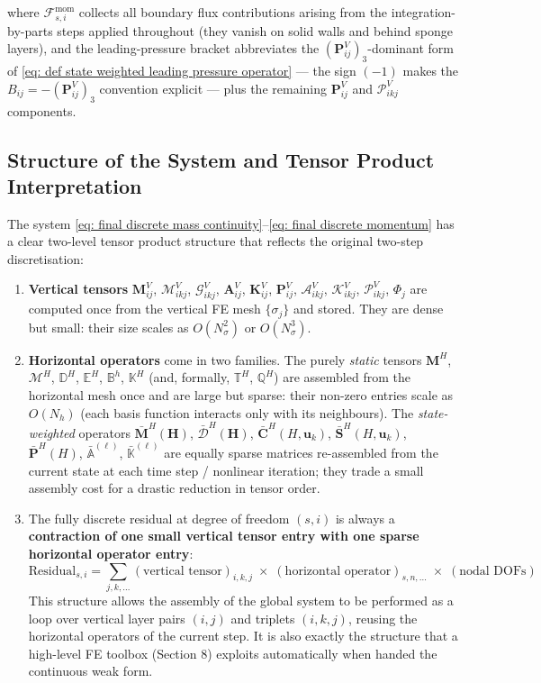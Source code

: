 \documentclass{article}
\newcommand{\Ns}{N_\sigma}
\newcommand{\uk}{\mathbf{u}_k}
\newcommand{\VMij}{\mathbf{M}_{ij}^V}
\newcommand{\VAij}{\mathbf{A}_{ij}^V}
\newcommand{\VKij}{\mathbf{K}_{ij}^V}
\newcommand{\VMikj}{\boldsymbol{\mathcal{M}}_{ikj}^V}
\newcommand{\VGikj}{\boldsymbol{\mathcal{G}}_{ikj}^V}
\newcommand{\VAikj}{\boldsymbol{\mathcal{A}}_{ikj}^V}
\newcommand{\VKikj}{\boldsymbol{\mathcal{K}}_{ikj}^V}
\newcommand{\VPij}{\mathbf{P}_{ij}^V}
\newcommand{\VPikj}{\boldsymbol{\mathcal{P}}_{ikj}^V}
\newcommand{\Nh}{N_h}
\newcommand{\HmM}{\mathbf{M}^H}
\newcommand{\HtM}{\boldsymbol{\mathcal{M}}^H}
\newcommand{\HtDdwH}{\bar{\boldsymbol{\mathcal{D}}}^H(\Hvec)}
\newcommand{\HmMdwH}{\bar{\mathbf{M}}^H(\Hvec)}
\newcommand{\HttD}{\mathbb{D}^H}
\newcommand{\Hvec}{\mathbf{H}}
\begin{document}
\noindent where $\mathcal{F}_{s,i}^{\text{mom}}$ collects all boundary flux contributions arising from the integration-by-parts steps applied throughout (they vanish on solid walls and behind sponge layers), and the leading-pressure bracket abbreviates the $(\VPij)_3$-dominant form of \eqref{eq: def state weighted leading pressure operator} — the sign $(-1)$ makes the $B_{ij} = -(\VPij)_3$ convention explicit — plus the remaining $\VPij$ and $\VPikj$ components.
 
\subsection{Structure of the System and Tensor Product Interpretation}
 
The system \eqref{eq: final discrete mass continuity}--\eqref{eq: final discrete momentum} has a clear two-level tensor product structure that reflects the original two-step discretisation:
 
\begin{enumerate}
    \item \textbf{Vertical tensors} $\VMij$, $\VMikj$, $\VGikj$, $\VAij$, $\VKij$, $\VPij$, $\VAikj$, $\VKikj$, $\VPikj$, $\Phi_j$ are computed once from the vertical FE mesh $\{\sigma_j\}$ and stored. They are dense but small: their size scales as $O(\Ns^2)$ or $O(\Ns^3)$.

    \item \textbf{Horizontal operators} come in two families. The purely \emph{static} tensors $\HmM$, $\HtM$, $\HttD$, $\mathbb{E}^H$, $\mathbb{B}^h$, $\mathbb{K}^H$ (and, formally, $\mathbb{T}^H$, $\mathbb{Q}^H$) are assembled from the horizontal mesh once and are large but sparse: their non-zero entries scale as $O(\Nh)$ (each basis function interacts only with its neighbours). The \emph{state-weighted} operators $\HmMdwH$, $\HtDdwH$, $\bar{\mathbf{C}}^H(H,\uk)$, $\bar{\mathbf{S}}^H(H,\uk)$, $\bar{\mathbf{P}}^H(H)$, $\bar{\mathbb{A}}^{(\ell)}$, $\bar{\mathbb{K}}^{(\ell)}$ are equally sparse matrices re-assembled from the current state at each time step / nonlinear iteration; they trade a small assembly cost for a drastic reduction in tensor order.

    \item The fully discrete residual at degree of freedom $(s,i)$ is always a \textbf{contraction of one small vertical tensor entry with one sparse horizontal operator entry}:
    \begin{equation*}
        \text{Residual}_{s,i} = \sum_{j,k,\ldots} (\text{vertical tensor})_{i,k,j}\;\times\;(\text{horizontal operator})_{s,n,\ldots}\;\times\;(\text{nodal DOFs})
    \end{equation*}
    This structure allows the assembly of the global system to be performed as a loop over vertical layer pairs $(i,j)$ and triplets $(i,k,j)$, reusing the horizontal operators of the current step. It is also exactly the structure that a high-level FE toolbox (Section 8) exploits automatically when handed the continuous weak form.
\end{enumerate}
 
\end{document}
